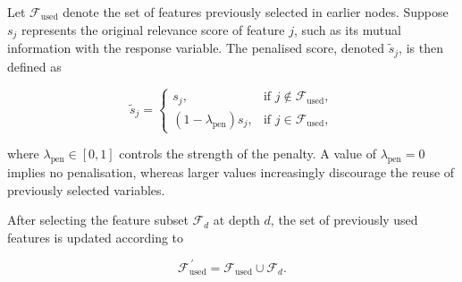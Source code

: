 Let \(\mathcal{F}_{\text{used}}\) denote the set of features previously selected in earlier nodes. Suppose \(s_j\) represents the original relevance score of feature \(j\), such as its mutual information with the response variable. The penalised score, denoted \(\tilde{s}_j\), is then defined as

\[
\tilde{s}_j =
\begin{cases}
s_j, & \text{if } j \notin \mathcal{F}_{\text{used}}, \\[6pt]
(1 - \lambda_{\text{pen}}) s_j, & \text{if } j \in \mathcal{F}_{\text{used}} ,
\end{cases}
\]

where \(\lambda_{\text{pen}} \in [0,1]\) controls the strength of the penalty. A value of \(\lambda_{\text{pen}} = 0\) implies no penalisation, whereas larger values increasingly discourage the reuse of previously selected variables.

After selecting the feature subset \(\mathcal{F}_d\) at depth \(d\), the set of previously used features is updated according to

\[
\mathcal{F}_{\text{used}}^{\,\prime} = \mathcal{F}_{\text{used}} \cup \mathcal{F}_d.
\]

